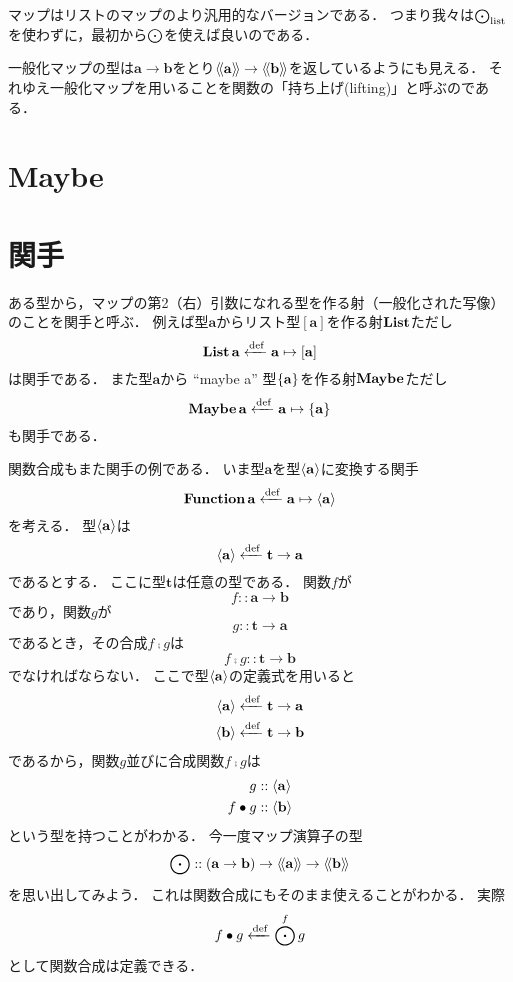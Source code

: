 \documentclass[twocolumn]{jsbook}
\newcommand{\typename}[1]{\mathbf{#1}}
\newcommand{\listtype}[1]{\left[#1\right]}
\begin{document}
マップはリストのマップのより汎用的なバージョンである．
つまり我々は$\bigodot_\text{list}$を使わずに，最初から$\bigodot$を使えば良いのである．

一般化マップの型は$\typename{a}\rightarrow\typename{b}$をとり$\generalcontainer{\typename{a}}\rightarrow\generalcontainer{\typename{b}}$を返しているようにも見える．
それゆえ一般化マップを用いることを関数の「持ち上げ(lifting)」と呼ぶのである．

\section{Maybe}



\section{関手}

ある型から，マップの第2（右）引数になれる型を作る射（一般化された写像）のことを関手と呼ぶ．
例えば型$\typename{a}$からリスト型$[\typename{a}]$を作る射$\mathop{\mathop{\textbf{List}}}$ただし$$\listfunctor\typename{a}\defeq\typename{a}\mapsto\listtype{\typename{a}}$$は関手である．
また型$\typename{a}$から ``maybe a'' 型$\maybe{\typename{a}}$を作る射$\mathop{\mathop{\textbf{Maybe}}}$ただし$$\maybefunctor\typename{a}\defeq\typename{a}\mapsto\maybe{\typename{a}}$$も関手である．

関数合成もまた関手の例である．
いま型$\typename{a}$を型$\function{\typename{a}}$に変換する関手$$\functionfunctor\typename{a}\defeq\typename{a}\mapsto\function{\typename{a}}$$を考える．
型$\function{\typename{a}}$は$$\function{\typename{a}}\defeq\typename{t}\rightarrow\typename{a}$$であるとする．
ここに型$\typename{t}$は任意の型である．
関数$f$が$$f::\typename{a}\rightarrow\typename{b}$$であり，関数$g$が$$g::\typename{t}\rightarrow\typename{a}$$であるとき，その合成$f\comp g$は$$f\comp g::\typename{t}\rightarrow\typename{b}$$でなければならない．
ここで型$\function{\typename{a}}$の定義式を用いると
\begin{align*}
\function{\typename{a}}&\defeq\typename{t}\rightarrow\typename{a}\\
\function{\typename{b}}&\defeq\typename{t}\rightarrow\typename{b}
\end{align*}
であるから，関数$g$並びに合成関数$f\comp g$は
\begin{align*}
g&::\function{\typename{a}}\\
f\comp g&::\function{\typename{b}}
\end{align*}
という型を持つことがわかる．
今一度マップ演算子の型$$\mapfunc::(\typename{a}\rightarrow\typename{b})\rightarrow\generalcontainer{\typename{a}}\rightarrow\generalcontainer{\typename{b}}$$を思い出してみよう．
これは関数合成にもそのまま使えることがわかる．
実際$$f\bullet g\xleftarrow{\text{def}}\bigodot^fg$$として関数合成は定義できる．
\end{document}
